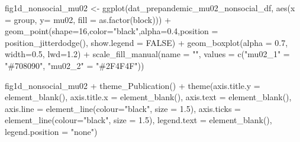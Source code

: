\documentclass[
]{article}
\newenvironment{Shaded}{\begin{snugshade}}{\end{snugshade}}
\newcommand{\AttributeTok}[1]{\textcolor[rgb]{0.77,0.63,0.00}{#1}}
\newcommand{\ConstantTok}[1]{\textcolor[rgb]{0.00,0.00,0.00}{#1}}
\newcommand{\DecValTok}[1]{\textcolor[rgb]{0.00,0.00,0.81}{#1}}
\newcommand{\FloatTok}[1]{\textcolor[rgb]{0.00,0.00,0.81}{#1}}
\newcommand{\FunctionTok}[1]{\textcolor[rgb]{0.00,0.00,0.00}{#1}}
\newcommand{\NormalTok}[1]{#1}
\newcommand{\OtherTok}[1]{\textcolor[rgb]{0.56,0.35,0.01}{#1}}
\newcommand{\SpecialCharTok}[1]{\textcolor[rgb]{0.00,0.00,0.00}{#1}}
\newcommand{\StringTok}[1]{\textcolor[rgb]{0.31,0.60,0.02}{#1}}
\begin{document}
\begin{Shaded}
\begin{Highlighting}[]
\NormalTok{fig1d\_nonsocial\_mu02 }\OtherTok{\textless{}{-}} \FunctionTok{ggplot}\NormalTok{(dat\_prepandemic\_mu02\_nonsocial\_df, }\FunctionTok{aes}\NormalTok{(}\AttributeTok{x =}\NormalTok{ group,}
                                                                      \AttributeTok{y=}\NormalTok{ mu02,}
                                                                      \AttributeTok{fill =} \FunctionTok{as.factor}\NormalTok{(block))) }\SpecialCharTok{+}
  \FunctionTok{geom\_point}\NormalTok{(}\AttributeTok{shape=}\DecValTok{16}\NormalTok{,}\AttributeTok{color=}\StringTok{"black"}\NormalTok{,}\AttributeTok{alpha=}\FloatTok{0.4}\NormalTok{,}\AttributeTok{position =} \FunctionTok{position\_jitterdodge}\NormalTok{(), }\AttributeTok{show.legend =} \ConstantTok{FALSE}\NormalTok{) }\SpecialCharTok{+} 
  \FunctionTok{geom\_boxplot}\NormalTok{(}\AttributeTok{alpha =} \FloatTok{0.7}\NormalTok{, }\AttributeTok{width=}\FloatTok{0.5}\NormalTok{, }\AttributeTok{lwd=}\FloatTok{1.2}\NormalTok{) }\SpecialCharTok{+}
  \FunctionTok{scale\_fill\_manual}\NormalTok{(}\AttributeTok{name =} \StringTok{""}\NormalTok{, }
                    \AttributeTok{values =} \FunctionTok{c}\NormalTok{(}\StringTok{"mu02\_1"} \OtherTok{=} \StringTok{"\#708090"}\NormalTok{, }\StringTok{"mu02\_2"} \OtherTok{=} \StringTok{"\#2F4F4F"}\NormalTok{))}


\NormalTok{fig1d\_nonsocial\_mu02 }\SpecialCharTok{+} \FunctionTok{theme\_Publication}\NormalTok{() }\SpecialCharTok{+} \FunctionTok{theme}\NormalTok{(}\AttributeTok{axis.title.y =} \FunctionTok{element\_blank}\NormalTok{(),}
                                                   \AttributeTok{axis.title.x =} \FunctionTok{element\_blank}\NormalTok{(),}
                                                   \AttributeTok{axis.text =} \FunctionTok{element\_blank}\NormalTok{(), }
                                                   \AttributeTok{axis.line =} \FunctionTok{element\_line}\NormalTok{(}\AttributeTok{colour=}\StringTok{"black"}\NormalTok{, }\AttributeTok{size =} \FloatTok{1.5}\NormalTok{),}
                                                   \AttributeTok{axis.ticks =} \FunctionTok{element\_line}\NormalTok{(}\AttributeTok{colour=}\StringTok{"black"}\NormalTok{, }\AttributeTok{size =} \FloatTok{1.5}\NormalTok{),}
                                                   \AttributeTok{legend.text =} \FunctionTok{element\_blank}\NormalTok{(),}
                                                   \AttributeTok{legend.position =} \StringTok{"none"}\NormalTok{)}
\end{Highlighting}
\end{Shaded}
\end{document}
